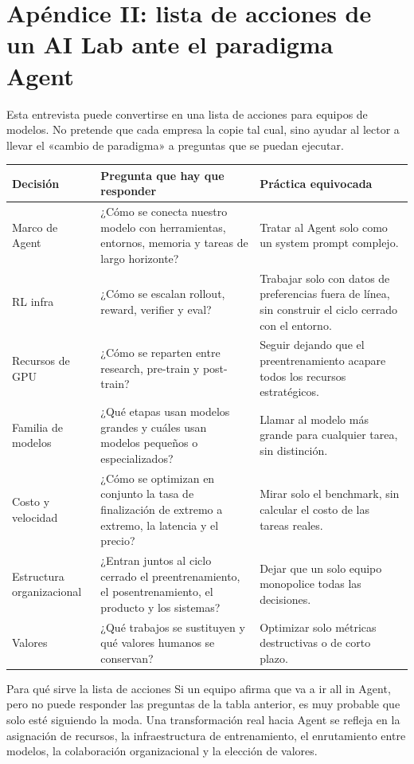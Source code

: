 \section{Apéndice II: lista de acciones de un AI Lab ante el paradigma Agent}

Esta entrevista puede convertirse en una lista de acciones para equipos de modelos. No pretende que cada empresa la copie tal cual, sino ayudar al lector a llevar el «cambio de paradigma» a preguntas que se puedan ejecutar.

\noindent\begin{longtable}{p{}p{}p{}}
\toprule
Decisión & Pregunta que hay que responder & Práctica equivocada \\
\midrule
Marco de Agent & ¿Cómo se conecta nuestro modelo con herramientas, entornos, memoria y tareas de largo horizonte? & Tratar al Agent solo como un system prompt complejo. \\
RL infra & ¿Cómo se escalan rollout, reward, verifier y eval? & Trabajar solo con datos de preferencias fuera de línea, sin construir el ciclo cerrado con el entorno. \\
Recursos de GPU & ¿Cómo se reparten entre research, pre-train y post-train? & Seguir dejando que el preentrenamiento acapare todos los recursos estratégicos. \\
Familia de modelos & ¿Qué etapas usan modelos grandes y cuáles usan modelos pequeños o especializados? & Llamar al modelo más grande para cualquier tarea, sin distinción. \\
Costo y velocidad & ¿Cómo se optimizan en conjunto la tasa de finalización de extremo a extremo, la latencia y el precio? & Mirar solo el benchmark, sin calcular el costo de las tareas reales. \\
Estructura organizacional & ¿Entran juntos al ciclo cerrado el preentrenamiento, el posentrenamiento, el producto y los sistemas? & Dejar que un solo equipo monopolice todas las decisiones. \\
Valores & ¿Qué trabajos se sustituyen y qué valores humanos se conservan? & Optimizar solo métricas destructivas o de corto plazo. \\
\bottomrule
\end{longtable}

\begin{importantbox}{Para qué sirve la lista de acciones}
Si un equipo afirma que va a ir all in Agent, pero no puede responder las preguntas de la tabla anterior, es muy probable que solo esté siguiendo la moda. Una transformación real hacia Agent se refleja en la asignación de recursos, la infraestructura de entrenamiento, el enrutamiento entre modelos, la colaboración organizacional y la elección de valores.
\end{importantbox}

